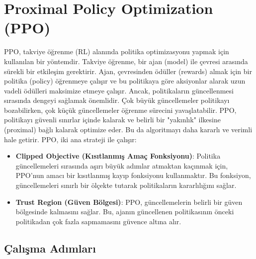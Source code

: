 \section{Proximal Policy Optimization (PPO)}

PPO, takviye öğrenme (RL) alanında politika optimizasyonu yapmak için kullanılan bir yöntemdir. Takviye öğrenme, bir ajan (model) ile çevresi arasında sürekli bir etkileşim gerektirir. Ajan, çevresinden ödüller (rewards) almak için bir politika (policy) öğrenmeye çalışır ve bu politikaya göre aksiyonlar alarak uzun vadeli ödülleri maksimize etmeye çalışır. Ancak, politikaların güncellenmesi sırasında dengeyi sağlamak önemlidir. Çok büyük güncellemeler politikayı bozabilirken, çok küçük güncellemeler öğrenme sürecini yavaşlatabilir. PPO, politikayı güvenli sınırlar içinde kalarak ve belirli bir "yakınlık" ilkesine (proximal) bağlı kalarak optimize eder. Bu da algoritmayı daha kararlı ve verimli hale getirir. PPO, iki ana strateji ile çalışır:

\begin{itemize}
    \item \textbf{Clipped Objective (Kısıtlanmış Amaç Fonksiyonu)}: Politika güncellemeleri sırasında aşırı büyük adımlar atmaktan kaçınmak için, PPO'nun amacı bir kısıtlanmış kayıp fonksiyonu kullanmaktır. Bu fonksiyon, güncellemeleri sınırlı bir ölçekte tutarak politikaların kararlılığını sağlar.
    \item \textbf{Trust Region (Güven Bölgesi)}: PPO, güncellemelerin belirli bir güven bölgesinde kalmasını sağlar. Bu, ajanın güncellenen politikasının önceki politikadan çok fazla sapmamasını güvence altına alır.
\end{itemize}

\subsection{Çalışma Adımları}

